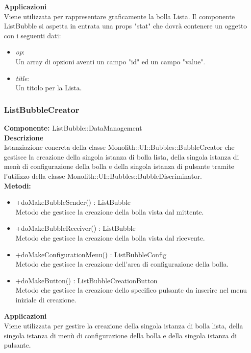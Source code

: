 \textbf{Applicazioni}\\
Viene utilizzata per rappresentare graficamente la bolla Lista.
Il componente ListBubble si aspetta in entrata una props "stat" che dovrà contenere un oggetto con i seguenti dati: \\
\begin{itemize}
\item \textit{op}:
\\
Un array di opzioni aventi un campo "id" ed un campo "value".
\item \textit{title}:
\\
Un titolo per la Lista.
\end{itemize} 


\clearpage

\subsubsection{ListBubbleCreator}
\textbf{Componente:}  ListBubble::DataManagement\\
\textbf{Descrizione}\\
Istanziazione concreta della classe Monolith::UI::Bubbles::BubbleCreator che gestisce la creazione della singola istanza di bolla lista, della singola istanza di menù di configurazione della bolla e della singola istanza di pulsante tramite l'utilizzo della classe Monolith::UI::Bubbles::BubbleDiscriminator.
\\
\textbf{Metodi:} 
\begin{itemize}
\item +doMakeBubbleSender() : ListBubble 
\\
Metodo che gestisce la creazione della bolla vista dal mittente.
\item +doMakeBubbleReceiver() : ListBubble 
\\
Metodo che gestisce la creazione della bolla vista dal ricevente.
\item +doMakeConfigurationMenu() : ListBubbleConfig 
\\
Metodo che gestisce la creazione dell'area di configurazione della bolla.
\item +doMakeButton() : ListBubbleCreationButton 
\\
Metodo che gestisce la creazione dello specifico pulsante da inserire nel menu iniziale di creazione.
\end{itemize} 


\textbf{Applicazioni}\\
Viene utilizzata per gestire la creazione della singola istanza di bolla lista, della singola istanza di menù di configurazione della bolla e della singola istanza di pulsante. 


